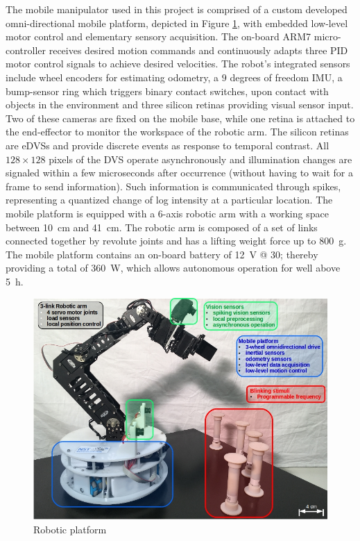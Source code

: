 The mobile manipulator used in this project is comprised of a custom developed omni-directional mobile platform, depicted in Figure \ref{fig:omniarmbot}, with embedded low-level motor control and elementary sensory acquisition. 
The on-board ARM7 micro-controller receives desired motion commands and continuously adapts three PID motor control signals to achieve desired velocities. 
The robot's integrated sensors include wheel encoders for estimating odometry, a $9$ degrees of freedom \ac{IMU}, a bump-sensor ring which triggers binary contact switches, upon contact with objects in the environment and three silicon retinas providing visual sensor input. 
Two of these cameras are fixed on the mobile base, while one retina is attached to the end-effector to monitor the workspace of the robotic arm. 
The silicon retinas are \acp{eDVS} and provide discrete events as response to temporal contrast. 
All $128 \times 128$ pixels of the \ac{DVS} operate asynchronously and illumination changes are signaled within a few microseconds after occurrence (without having to wait for a frame to send information). 
Such information is communicated through spikes, representing a quantized change of log intensity at a particular location. 
The mobile platform is equipped with a $6$-axis robotic arm with a working space between \SI{10}{\centi\metre} and \SI{41}{\centi\metre}. 
The robotic arm is composed of a set of links connected together by revolute joints and has a lifting weight force up to \SI{800}{\gram}. 
The mobile platform contains an on-board battery of \SI{12}{\volt} @ \SI{30}{\amperehour}; thereby providing a total of \SI{360}{\watt}, which allows autonomous operation for well above \SI{5}{\hour}.

\begin{figure}[t]
    \centering
    \includegraphics[width=0.8\linewidth]{imgs/omniarmbot.png}
    \caption{Robotic platform}
    \label{fig:omniarmbot}
\end{figure}

